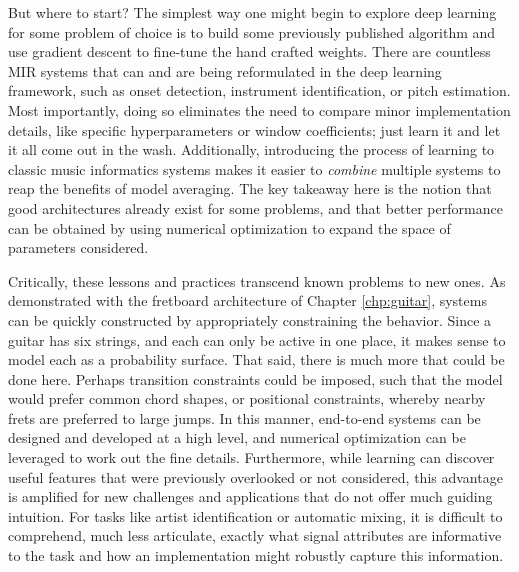 But where to start?
The simplest way one might begin to explore deep learning for some problem of choice is to build some previously published algorithm and use gradient descent to fine-tune the hand crafted weights.
There are countless MIR systems that can and are being reformulated in the deep learning framework, such as onset detection, instrument identification, or pitch estimation.
Most importantly, doing so eliminates the need to compare minor implementation details, like specific hyperparameters or window coefficients;
just learn it and let it all come out in the wash.
Additionally, introducing the process of learning to classic music informatics systems makes it easier to \emph{combine} multiple systems to reap the benefits of model averaging.
The key takeaway here is the notion that good architectures already exist for some problems, and that better performance can be obtained by using numerical optimization to expand the space of parameters considered.

Critically, these lessons and practices transcend known problems to new ones.
As demonstrated with the fretboard architecture of Chapter \ref{chp:guitar}, systems can be quickly constructed by appropriately constraining the behavior.
Since a guitar has six strings, and each can only be active in one place, it makes sense to model each as a probability surface.
That said, there is much more that could be done here.
Perhaps transition constraints could be imposed, such that the model would prefer common chord shapes, or positional constraints, whereby nearby frets are preferred to large jumps.
In this manner, end-to-end systems can be designed and developed at a high level, and numerical optimization can be leveraged to work out the fine details.
Furthermore, while learning can discover useful features that were previously overlooked or not considered, this advantage is amplified for new challenges and applications that do not offer much guiding intuition.
For tasks like artist identification or automatic mixing, it is difficult to comprehend, much less articulate, exactly what signal attributes are informative to the task and how an implementation might robustly capture this information.

